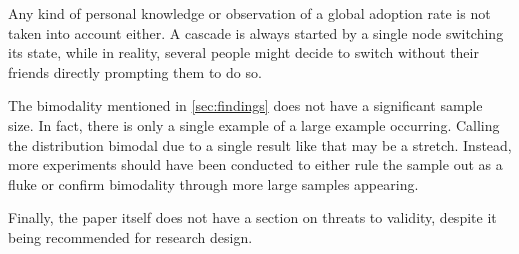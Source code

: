\documentclass{sig-alternate-05-2015}
\begin{document}
Any kind of personal knowledge or observation of a global adoption rate is not taken into account either. A cascade is always started by a single node switching its state, while in reality, several people might decide to switch without their friends directly prompting them to do so.

The bimodality mentioned in \ref{sec:findings} does not have a significant sample size. In fact, there is only a single example of a large example occurring. Calling the distribution bimodal due to a single result like that may be a stretch. Instead, more experiments should have been conducted to either rule the sample out as a fluke or confirm bimodality through more large samples appearing.

Finally, the paper itself does not have a section on threats to validity, despite it being recommended for research design\cite{yodawg}.




\end{document}
